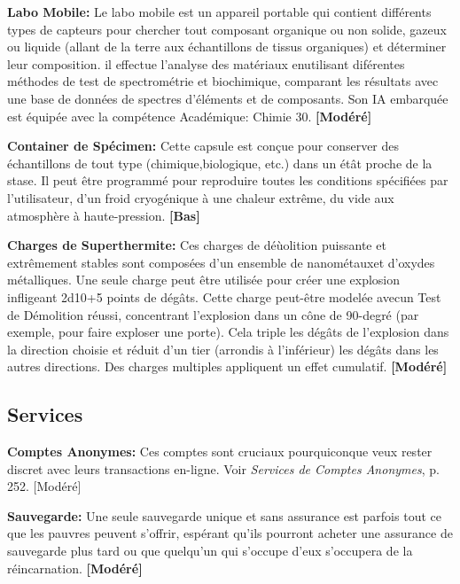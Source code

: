 \textbf{Labo Mobile:} Le labo mobile est un appareil portable qui contient différents types de capteurs pour chercher tout composant organique ou non solide, gazeux ou liquide (allant de la terre aux échantillons de tissus organiques) et déterminer leur composition. il effectue l'analyse des matériaux enutilisant diférentes méthodes de test de spectrométrie et biochimique, comparant les résultats avec une base de données de spectres d'éléments et de composants. Son IA embarquée est équipée avec la compétence Académique: Chimie 30. \textbf{[Modéré]} 

\textbf{Container de Spécimen:} Cette capsule est conçue pour conserver des échantillons de tout type (chimique,biologique, etc.) dans un étât proche de la stase. Il peut être programmé pour reproduire toutes les conditions spécifiées par l'utilisateur, d'un froid cryogénique à une chaleur extrême, du vide aux atmosphère à haute-pression. \textbf{[Bas]} 

\textbf{Charges de Superthermite:} Ces charges de déùolition puissante et extrêmement stables sont composées d'un ensemble de nanométauxet d'oxydes métalliques. Une seule charge peut être utilisée pour créer une explosion infligeant 2d10+5 points de dégâts. Cette charge peut-être modelée avecun Test de Démolition réussi, concentrant l'explosion dans un cône de 90-degré (par exemple, pour faire exploser une porte). Cela triple les dégâts de l'explosion dans la direction choisie et réduit d'un tier (arrondis à l'inférieur) les dégâts dans les autres directions. Des charges multiples appliquent un effet cumulatif. \textbf{[Modéré]} 

\subsection{Services} \label{sec:services} 

\textbf{Comptes Anonymes:} Ces comptes sont cruciaux pourquiconque veux rester discret avec leurs transactions en-ligne. Voir \emph{Services de Comptes Anonymes}, p. 252. [Modéré] 

\textbf{Sauvegarde:} Une seule sauvegarde unique et sans assurance est parfois tout ce que les pauvres peuvent s'offrir, espérant qu'ils pourront acheter une assurance de sauvegarde plus tard ou que quelqu'un qui s'occupe d'eux s'occupera de la réincarnation. \textbf{[Modéré]} 

